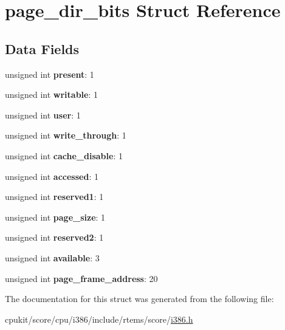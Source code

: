 \hypertarget{structpage__dir__bits}{}\section{page\+\_\+dir\+\_\+bits Struct Reference}
\label{structpage__dir__bits}
\subsection*{Data Fields}
\begin{DoxyCompactItemize}
\item 
\mbox{\label{structpage__dir__bits_a371e736a56c8507331dad2ce1189e4fc}} 
unsigned int {\bfseries present}\+: 1
\item 
\mbox{\label{structpage__dir__bits_a785d1a41e147caed9fe50877479046f9}} 
unsigned int {\bfseries writable}\+: 1
\item 
\mbox{\label{structpage__dir__bits_ab852183fa6661f7b79d0b98269372699}} 
unsigned int {\bfseries user}\+: 1
\item 
\mbox{\label{structpage__dir__bits_a65327e385fb752fbe3e504e62e00e2cc}} 
unsigned int {\bfseries write\+\_\+through}\+: 1
\item 
\mbox{\label{structpage__dir__bits_a89bd9fb54b7e62d89d801c70cbe0d419}} 
unsigned int {\bfseries cache\+\_\+disable}\+: 1
\item 
\mbox{\label{structpage__dir__bits_ae33d05e799e14c8bbeb3b9cb2726a6ea}} 
unsigned int {\bfseries accessed}\+: 1
\item 
\mbox{\label{structpage__dir__bits_a0ab62390a32bc0029ccdc0237b67b99f}} 
unsigned int {\bfseries reserved1}\+: 1
\item 
\mbox{\label{structpage__dir__bits_afc5feaeca721b029fed676826fc3c2cc}} 
unsigned int {\bfseries page\+\_\+size}\+: 1
\item 
\mbox{\label{structpage__dir__bits_a9b0b3edd24487c7cdddb2efc48bed20f}} 
unsigned int {\bfseries reserved2}\+: 1
\item 
\mbox{\label{structpage__dir__bits_a03e12c19ba8d3053bab17b2786199e53}} 
unsigned int {\bfseries available}\+: 3
\item 
\mbox{\label{structpage__dir__bits_a34158e2a4782119d89f33983401654e3}} 
unsigned int {\bfseries page\+\_\+frame\+\_\+address}\+: 20
\end{DoxyCompactItemize}


The documentation for this struct was generated from the following file\+:\begin{DoxyCompactItemize}
\item 
cpukit/score/cpu/i386/include/rtems/score/\mbox{\hyperlink{i386_8h}{i386.\+h}}\end{DoxyCompactItemize}
